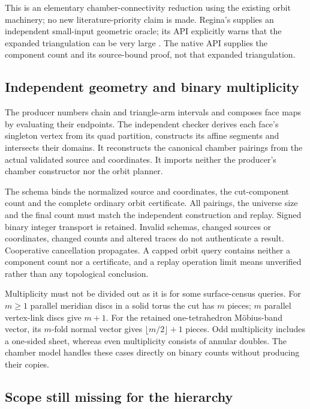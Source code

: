 This is an elementary chamber-connectivity reduction using the existing
orbit machinery; no new literature-priority claim is made. Regina's
 supplies an independent small-input geometric oracle; its
API explicitly warns that the expanded triangulation can be very large
\cite{regina-cut-along}. The native API supplies the component count and
its source-bound proof, not that expanded triangulation.

\subsection{Independent geometry and binary multiplicity}

The producer numbers chain and triangle-arm intervals and composes face
maps by evaluating their endpoints. The independent checker derives each
face's singleton vertex from its quad partition, constructs its affine
segments and intersects their domains. It reconstructs the canonical chamber
pairings from the actual validated source and coordinates. It imports neither
the producer's chamber constructor nor the orbit planner.

The schema  binds the normalized source
and coordinates, the cut-component count and the complete ordinary orbit
certificate. All pairings, the universe size and the final count must match
the independent construction and replay. Signed binary integer transport
is retained. Invalid schemas, changed sources or coordinates, changed counts
and altered traces do not authenticate a result. Cooperative cancellation
propagates. A capped orbit query contains neither a component count nor
a certificate, and a replay operation limit means unverified rather than
any topological conclusion.

Multiplicity must not be divided out as it is for some surface-census queries.
For $m\ge1$ parallel meridian discs in a solid torus the cut has $m$ pieces;
$m$ parallel vertex-link discs give $m+1$. For the retained one-tetrahedron
M\"obius-band vector, its $m$-fold normal vector gives
$\lfloor m/2\rfloor+1$ pieces. Odd multiplicity includes a one-sided sheet,
whereas even multiplicity consists of annular doubles. The chamber model
handles these cases directly on binary counts without producing their copies.

\subsection{Scope still missing for the hierarchy}

